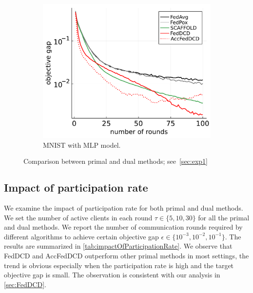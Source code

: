 \begin{figure}[t]
    \begin{subfigure}{.33\textwidth}
      \centering
      \includegraphics[width=\linewidth]{./figures/exp1_mnist_mlp_20epochs.pdf}
      \caption{MNIST with MLP model.}
      \label{fig:exp1_mnist_mlp}
    \end{subfigure}
    \caption{Comparison between primal and dual methods; see~\autoref{sec:exp1}} 
    \label{fig:exp1}
\end{figure}

\subsection{Impact of participation rate} \label{sec:exp2}
We examine the impact of participation rate for both primal and dual methods. We set the number of active clients in each round $\tau \in \{ 5, 10, 30\}$ for all the primal and dual methods. We report the number of communication rounds required by different algorithms to achieve certain objective gap $\epsilon \in \{ 10^{-3}, 10^{-2}, 10^{-1}\}$. The results are summarized in \autoref{tab:impactOfParticipationRate}. We observe that FedDCD and AccFedDCD outperform other primal methods in most settings, the trend is obvious especially when the participation rate is high and the target objective gap is small.
The observation is consistent with our analysis in \autoref{sec:FedDCD}.

